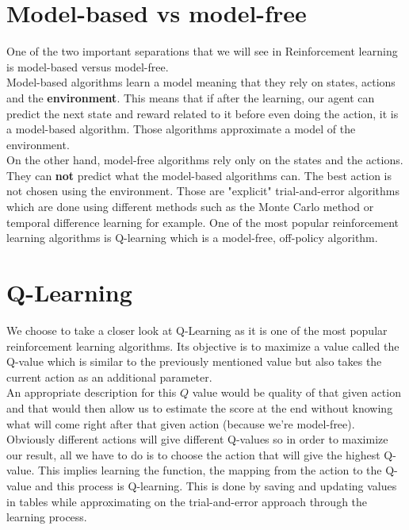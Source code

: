 \documentclass[a4paper,12pt,calibri,oneside,openany]{book}
\theoremstyle{break}
\begin{document}
\section{Model-based vs model-free}
One of the two important separations that we will see in Reinforcement learning is model-based versus model-free.\\

 Model-based algorithms learn a model meaning that they rely on states, actions and the \textbf{environment}. This means that if after the learning, our agent can predict the next state and reward related to it before even doing the action, it is a model-based algorithm. Those algorithms approximate a model of the environment. \\

On the other hand, model-free algorithms rely only on the states and the actions. They can \textbf{not} predict what the model-based algorithms can. The best action is not chosen using the environment. Those are "explicit" trial-and-error algorithms which are done using different methods such as the Monte Carlo method or temporal difference learning for example. One of the most popular reinforcement learning algorithms is Q-learning which is a model-free, off-policy algorithm.
\section{Q-Learning}
\qquad We choose to take a closer look at Q-Learning as it is one of the most popular reinforcement learning algorithms. Its objective is to maximize a value called the Q-value which is similar to the previously mentioned value but also takes the current action as an additional parameter.\\

An appropriate description for this $Q$ value would be quality of that given action and that would then allow us to estimate the score at the end without knowing what will come right after that given action (because we're model-free).\\

Obviously different actions will give different Q-values so in order to maximize our result, all we have to do is to choose the action that will give the highest Q-value. This implies learning the function, the mapping from the action to the Q-value and this process is Q-learning. This is done by saving and updating values in tables while approximating on the trial-and-error approach through the learning process.\\
\end{document}

